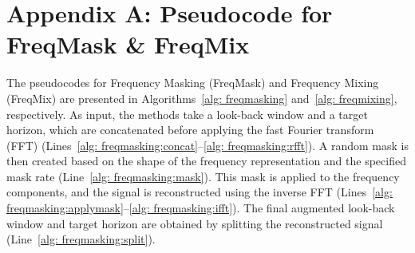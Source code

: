 \documentclass[a4paper,12pt]{report}
\begin{document}
 


 
 

 

% 

\clearpage
{}





\clearpage
\appendix


{}

\setcounter{chapter}{0}
\renewcommand{\thechapter}{\Alph{chapter}}

\renewcommand{\thetable}{\thechapter.\arabic{table}}
\renewcommand{\thefigure}{\thechapter.\arabic{figure}}
\renewcommand{\theequation}{\thechapter.\arabic{equation}}



\chapter*{Appendix A: Pseudocode for FreqMask \& FreqMix} 
\setcounter{chapter}{1} %
\setcounter{table}{0}
\setcounter{figure}{0}
\setcounter{equation}{0}
\renewcommand{\thechapter}{A}
\label{app:freqmask}


The pseudocodes for Frequency Masking (FreqMask) and Frequency Mixing (FreqMix) are presented in Algorithms~\ref{alg: freqmasking} and~\ref{alg: freqmixing}, respectively. As input, the methods take a look-back window and a target horizon, which are concatenated before applying the fast Fourier transform (FFT) (Lines~\ref{alg: freqmasking:concat}–\ref{alg: freqmasking:rfft}). A random mask is then created based on the shape of the frequency representation and the specified mask rate (Line~\ref{alg: freqmasking:mask}). This mask is applied to the frequency components, and the signal is reconstructed using the inverse FFT (Lines~\ref{alg: freqmasking:applymask}–\ref{alg: freqmasking:ifft}). The final augmented look-back window and target horizon are obtained by splitting the reconstructed signal (Line~\ref{alg: freqmasking:split}).
\end{document}
